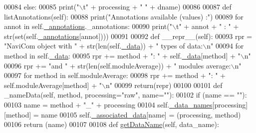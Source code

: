 \begin{DoxyCode}
00084                 \textcolor{keywordflow}{else}:
00085                     \textcolor{keywordflow}{print}(\textcolor{stringliteral}{"\(\backslash\)t"} + processing + \textcolor{stringliteral}{" "} + dname)
00086 
00087     \textcolor{keyword}{def }listAnnotations(self):
00088         \textcolor{keywordflow}{print}(\textcolor{stringliteral}{"Annotations available (values) :"})
00089         \textcolor{keywordflow}{for} annot \textcolor{keywordflow}{in} self.\hyperlink{classnavicom_1_1navicom_1_1NaviCom_afb88722efeb86813dcb85818b7065330}{_annotations}.\_annotations:
00090             \textcolor{keywordflow}{print}(\textcolor{stringliteral}{"\(\backslash\)t"} + annot + \textcolor{stringliteral}{" : "} + str(set(self.\hyperlink{classnavicom_1_1navicom_1_1NaviCom_afb88722efeb86813dcb85818b7065330}{_annotations}[annot])))
00091 
00092     \textcolor{keyword}{def }\_\_repr\_\_(self):
00093         rpr = \textcolor{stringliteral}{"NaviCom object with "} + str(len(self.\hyperlink{classnavicom_1_1navicom_1_1NaviCom_a407b2b5c30a5652ee85c4be54b3e6679}{_data})) + \textcolor{stringliteral}{" types of data:\(\backslash\)n"
      }
00094         \textcolor{keywordflow}{for} method \textcolor{keywordflow}{in} self.\hyperlink{classnavicom_1_1navicom_1_1NaviCom_a407b2b5c30a5652ee85c4be54b3e6679}{_data}:
00095             rpr += method + \textcolor{stringliteral}{": "} + self.\hyperlink{classnavicom_1_1navicom_1_1NaviCom_a407b2b5c30a5652ee85c4be54b3e6679}{_data}[method] + \textcolor{stringliteral}{"\(\backslash\)n"}
00096         rpr += \textcolor{stringliteral}{"and "} + str(len(self.moduleAverage)) + \textcolor{stringliteral}{" modules average:\(\backslash\)n"}
00097         \textcolor{keywordflow}{for} method \textcolor{keywordflow}{in} self.moduleAverage:
00098             rpr += method + \textcolor{stringliteral}{": "} + self.moduleAverage[method] + \textcolor{stringliteral}{"\(\backslash\)n"}
00099         \textcolor{keywordflow}{return}(repr)
00100     
00101     \textcolor{keyword}{def }\_nameData(self, method, processing="raw", name=""):
00102         \textcolor{keywordflow}{if} (name == \textcolor{stringliteral}{""}):
00103             name = method + \textcolor{stringliteral}{"\_"} + processing
00104         self.\hyperlink{classnavicom_1_1navicom_1_1NaviCom_ab8c34ab1a6d2a23f9b9ecee65375317a}{_data_names}[processing][method] = name
00105         self.\hyperlink{classnavicom_1_1navicom_1_1NaviCom_a2e1d67aee497222ac3e508f6812d6a10}{_associated_data}[name] = (processing, method)
00106         \textcolor{keywordflow}{return} (name)
00107 
00108     \textcolor{keyword}{def }\hyperlink{classnavicom_1_1navicom_1_1NaviCom_a51ecb41beebc7636bde73be2e1ffc407}{getDataName}(self, data\_name):

\end{DoxyCode}
